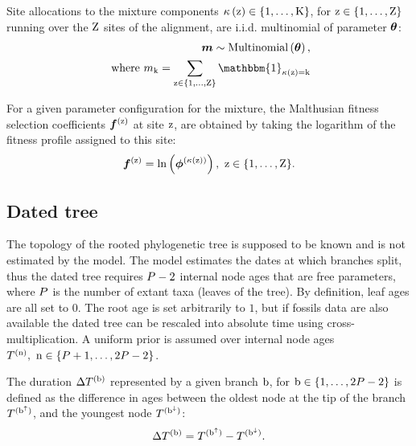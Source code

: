 \documentclass{article}
\begin{document}
    Site allocations to the mixture components $\kappa\left(\text{z}\right) \in \{1, \hdots, \text{K}\} $, for $\text{z} \in \{1, \hdots, \text{Z}\}$ running over the $\text{Z}$ sites of the alignment, are i.i.d. multinomial of parameter $\bm{\theta}$:
    \begin{align}
        \label{eq:DistribMultinomial}
        \catMultiVar \sim \text{Multinomial}\left( \StickBreaking \right), \\
        \text{ where } \catmultivar_{\cat} = \sum_{\Setsite} \mathbbm{1}_{\catsite = \cat}
    \end{align}

    For a given parameter configuration for the mixture, the Malthusian fitness selection coefficients $\bm{f}^{(\text{z})}$ at site $\text{z}$, are obtained by taking the logarithm of the fitness profile assigned to this site:
    \begin{equation}
        \label{eq:sitefitness}
        \bm{f}^{(\text{z})} = \ln \left( \bm{\phi}^{\left( \kappa\left(\text{z}\right) \right)} \right),\ \text{z} \in \{1, \hdots, \text{Z}\}.
    \end{equation}

    \subsection{Dated tree}
    The topology of the rooted phylogenetic tree is supposed to be known and is not estimated by the model.
    The model estimates the dates at which branches split, thus the dated tree requires $P - 2$ internal node ages that are free parameters, where $P$ is the number of extant taxa (leaves of the tree).
    By definition, leaf ages are all set to $0$.
    The root age is set arbitrarily to $1$, but if fossils data are also available the dated tree can be rescaled into absolute time using cross-multiplication.
    A uniform prior is assumed over internal node ages $T^{(\text{n})},\ \text{n} \in \{P + 1, \hdots, 2 P - 2\}$.

    The duration $\Delta T^{(\text{b})}$ represented by a given branch $\text{b}$, for $\text{b} \in \{1, \hdots, 2 P - 2\}$ is defined as the difference in ages between the oldest node at the tip of the branch $T^{(\text{b}^{\uparrow})}$, and the youngest node $T^{(\text{b}^{\downarrow})}$:
    \begin{equation}
        \label{eq:ageTobranchtime}
        \Delta T^{(\text{b})} = T^{(\text{b}^{\uparrow})} - T^{(\text{b}^{\downarrow})}.
    \end{equation}
\end{document}
